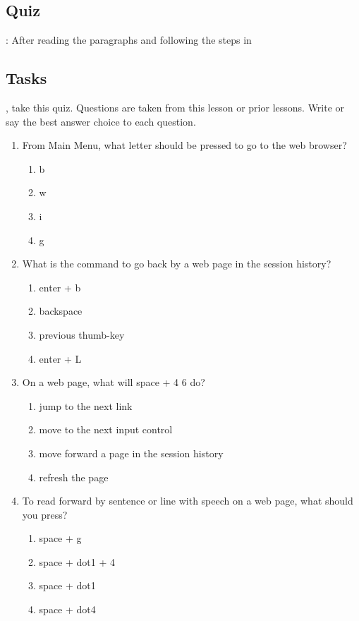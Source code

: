 \documentclass[10pt,letterpaper,twoside]{report}
\begin{document}
{\subsection{Quiz}:
After reading the paragraphs and following the steps in  \subsection{Tasks}, take this quiz. Questions are taken from this lesson or prior lessons.
Write or say the best answer choice to each question.
\begin{enumerate}
	\item From Main Menu, what letter should be pressed to go to the web browser?
	      \begin{enumerate}
		      \item b
		      \item w
		      \item i
		      \item g
	      \end{enumerate}
	\item What is the command to go back by a web page in the session history?
	      \begin{enumerate}
		      \item enter + b
		      \item backspace
		      \item previous thumb-key
		      \item enter + L
	      \end{enumerate}
	\item On a web page, what will space + 4 6 do?
	      \begin{enumerate}
		      \item jump to the next link
		      \item move to the next input control
		      \item move forward a page in the session history
		      \item refresh the page
	      \end{enumerate}
	\item To read forward by sentence or line with speech on a web page, what should you press?
	      \begin{enumerate}
		      \item space + g
		      \item space + dot1 + 4
		      \item space + dot1
		      \item space + dot4
	      \end{enumerate}

\end{enumerate}}
\end{document}
